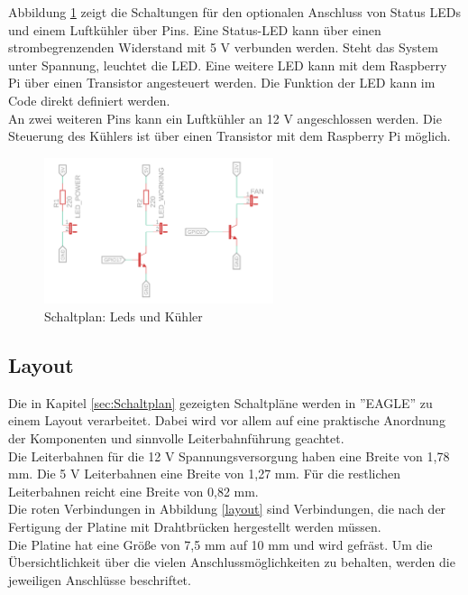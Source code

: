 Abbildung \ref{leds} zeigt die Schaltungen für den optionalen Anschluss von Status \acp{LED} und einem Luftkühler über Pins. Eine Status-\ac{LED} kann über einen strombegrenzenden Widerstand mit 5 V verbunden werden. Steht das System unter Spannung, leuchtet die \ac{LED}. Eine weitere \ac{LED} kann mit dem Raspberry Pi über einen Transistor angesteuert werden. Die Funktion der \ac{LED} kann im Code direkt definiert werden.\\
An zwei weiteren Pins kann ein Luftkühler an 12 V angeschlossen werden. Die Steuerung des Kühlers ist über einen Transistor mit dem Raspberry Pi möglich.
  
\begin{figure}[H]
	\centering
	\includegraphics[width=0.6\textwidth]{images/Hardware/Schaltplan/Leds}
	\caption{Schaltplan: Leds und Kühler}
	\label{leds}
\end{figure}



\subsection{Layout}

Die in Kapitel \ref{sec:Schaltplan} gezeigten Schaltpläne werden in ''EAGLE'' zu einem Layout verarbeitet. Dabei wird vor allem auf eine praktische Anordnung der Komponenten und sinnvolle Leiterbahnführung geachtet.\\
Die Leiterbahnen für die 12 V Spannungsversorgung haben eine Breite von 1,78 mm. Die 5 V Leiterbahnen eine Breite von 1,27 mm. Für die restlichen Leiterbahnen reicht eine Breite von 0,82 mm. \\
Die roten Verbindungen in Abbildung \ref{layout} sind Verbindungen, die nach der Fertigung der Platine mit Drahtbrücken hergestellt werden müssen. \\
Die Platine hat eine Größe von 7,5 mm auf 10 mm und wird gefräst. Um die Übersichtlichkeit über die vielen Anschlussmöglichkeiten zu behalten, werden die jeweiligen Anschlüsse beschriftet. 


